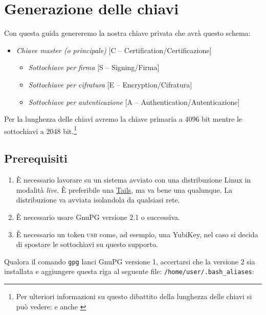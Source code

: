 \chapter{Generazione delle chiavi}

Con questa guida genereremo la nostra chiave privata che avrà questo schema:

\begin{itemize}
    \item \emph{Chiave master (o principale)} [C -- Certification/Certificazione]
    \begin{itemize}
        \item \emph{Sottochiave per firma} [S -- Signing/Firma]
        \item \emph{Sottochiave per cifratura} [E -- Encryption/Cifratura]
        \item \emph{Sottochiave per autenticazione} [A --
    Authentication/Autenticazione]
    \end{itemize}
\end{itemize}

Per la lunghezza delle chiavi avremo la chiave primaria a 4096 bit mentre le
sottochiavi a 2048 bit.\footnote{Per ulteriori informazioni su questo dibattito
della lunghezza delle chiavi si può vedere: \cite{gnupg:keylength} e anche
\cite{yubico:keylength}}

\section{Prerequisiti}

\begin{enumerate}
 \item È necessario lavorare su un sistema avviato con una distribuzione Linux
 in modalità \textit{live}. È preferibile una
 \href{https://tails.boum.org/index.it.html}{Tails}, ma va bene una qualunque.
 La distribuzione va avviata isolandola da qualsiasi rete.
 \item È necessario usare GnuPG versione 2.1 o successiva.
 \item È necessario un token \textsc{usb} come, ad esempio, una YubiKey, nel
 caso si decida di spostare le sottochiavi su questo supporto.
\end{enumerate}

Qualora il comando \texttt{gpg} lanci GnuPG versione 1, accertarsi che la
versione 2 sia installata e aggiungere questa riga al seguente file:\newline
\texttt{/home/user/.bash\_aliases}:

